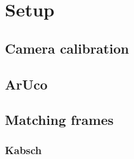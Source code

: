 
\setcounter{chapter}{2}

\chapter{Setup}

\section{Camera calibration}

\section{ArUco}

\section{Matching frames}

\subsection{Kabsch}
